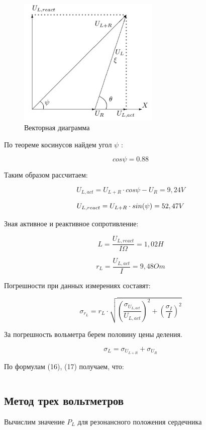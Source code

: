 \documentclass[a4paper,12pt]{article}
\begin{document}
\begin{figure}[h]
	\includegraphics[width = 0.6\textwidth]{vect_diag.jpg}
	\caption{Векторная диаграмма}
	\label{Pic1}
\end{figure}


По теореме косинусов найдем угол $ {\psi} $ :


$$cos\psi = 0.88$$


Таким образом рассчитаем:

$$
U_{L,act} = {U_{L+R}}\cdot {cos\psi} - U_R = 9,24 V
$$

$$
U_{L,react} = U_{L+R}\cdot sin(\psi) = 52,47 \vspace{0.2cm} V
$$

Зная активное и реактивное сопротивление:

$$
L = \frac{U_{L,react}}{{I}{\Omega}} = 1,02 H
$$

$$
r_L = \frac{U_{L,act}}{I} = 9,48 Om
$$

Погрешности при данных измерениях составят:

\begin{equation}\label{}
\sigma_{r_L} = r_L \cdot \sqrt{(\frac{\sigma_{U_{L,act}}}{U_{L, act}})^2 + (\frac{\sigma_I}{I})^2}
\end{equation}

За погрешность вольметра берем половину цены деления.

\begin{equation}\label{}
\sigma_{L} = \sigma_{U_{L+R}} + \sigma_{U_R}
\end{equation}

По формулам (16), (17) получаем, что:

$$
    
$$


\subsection{Метод трех вольтметров} 
Вычислим значение $ P_{L} $ для резонансного положения сердечника 
\end{document}
